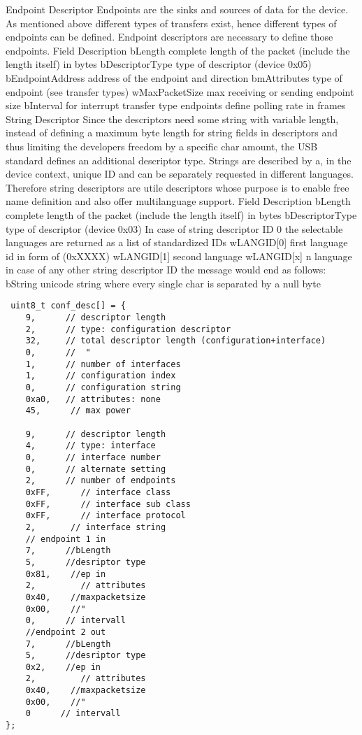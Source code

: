 Endpoint  Descriptor
Endpoints are the sinks and sources of data for the device. As mentioned above different types of transfers exist, hence different types of endpoints can be defined. Endpoint descriptors are necessary to define those endpoints.
Field
Description
bLength
complete length of the packet (include the length itself) in bytes
bDescriptorType
type of descriptor (device 0x05)
bEndpointAddress
address of the endpoint and direction
bmAttributes
type of endpoint (see transfer types)
wMaxPacketSize
max receiving or sending endpoint size
bInterval
for interrupt transfer type endpoints define polling rate in frames
String  Descriptor
Since the descriptors need some string with variable length, instead of defining a maximum byte length for string fields in descriptors and thus limiting the developers freedom by a specific char amount, the USB standard defines an additional descriptor type. Strings are described by a, in the device context, unique ID and can be separately requested in  different languages. Therefore string descriptors are utile descriptors whose purpose is to enable free name definition and also offer multilanguage support.
Field
Description
bLength
complete length of the packet (include the length itself) in bytes
bDescriptorType
type of descriptor (device 0x03)
In case of string descriptor ID 0 the selectable languages are returned as a list of standardized IDs
wLANGID[0]
first language id in form of (0xXXXX)
wLANGID[1]
second language
wLANGID[x]
n language 
in case of any other string descriptor ID the  message would end as follows:
bString
unicode string where every single char is separated by a null byte
\begin{verbatim}
 uint8_t conf_desc[] = {
	9,      // descriptor length
	2,      // type: configuration descriptor
	32,     // total descriptor length (configuration+interface)
	0,      //  "
	1,      // number of interfaces
	1,      // configuration index
	0,      // configuration string
	0xa0,   // attributes: none
	45,      // max power

	9,      // descriptor length
	4,      // type: interface
	0,      // interface number
	0,      // alternate setting
	2,      // number of endpoints
	0xFF,      // interface class
	0xFF,      // interface sub class
	0xFF,      // interface protocol
	2,       // interface string
	// endpoint 1 in
	7,      //bLength
	5,      //desriptor type
	0x81,    //ep in
	2,         // attributes
	0x40,    //maxpacketsize
	0x00,    //"
	0,      // intervall
	//endpoint 2 out
	7,      //bLength
	5,      //desriptor type
	0x2,    //ep in
	2,         // attributes
	0x40,    //maxpacketsize
	0x00,    //"
	0      // intervall
}; 
\end{verbatim}

